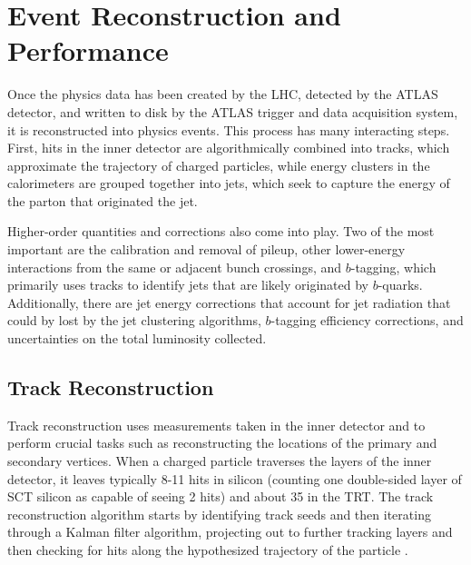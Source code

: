  

\chapter[Reconstruction and Performance]{Event Reconstruction and Performance}
Once the physics data has been created by the LHC, detected by the ATLAS detector, and written to 
disk by the ATLAS trigger and data acquisition system, it is reconstructed into physics events.  This process has 
many interacting steps.  First, hits in the inner detector are algorithmically combined into tracks, which approximate the 
trajectory of charged particles, while energy clusters in the calorimeters are grouped together into jets, which seek to 
capture the energy of the parton that originated the jet.  

Higher-order quantities and corrections also come into play.  Two of the most important are the calibration and removal of 
pileup, other lower-energy interactions from the same or adjacent bunch crossings, and $b$-tagging, 
which primarily uses tracks to identify jets that are likely originated by $b$-quarks.  Additionally, 
there are jet energy corrections that account for jet radiation that could by lost by the jet clustering algorithms, 
$b$-tagging efficiency corrections, and uncertainties on the total luminosity collected. 



\section{Track Reconstruction}
\label{sec:trk_reco}
Track reconstruction uses measurements taken in the inner detector and 
to perform crucial tasks such as reconstructing the locations of the primary and secondary vertices.  
When a charged particle traverses the layers of the inner detector, it leaves typically 8-11 hits in 
silicon (counting one double-sided layer of SCT silicon as capable of seeing 2 hits) and about 
35 in the TRT.  The track reconstruction algorithm  
starts by identifying track seeds and then iterating through a Kalman filter algorithm, projecting out to further tracking layers 
and then checking for hits along the hypothesized trajectory of the particle \cite{newt}.  

